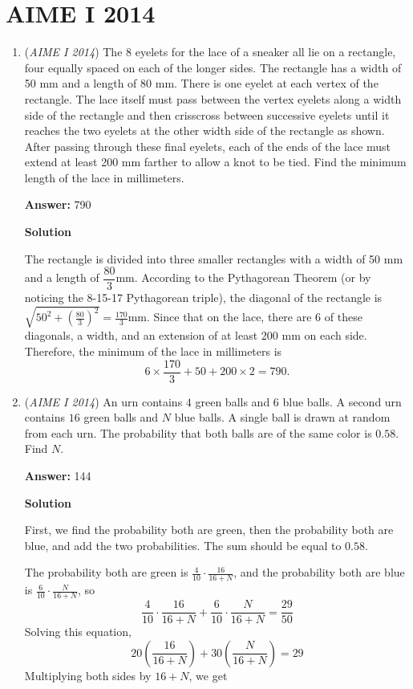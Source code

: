 \section{AIME I 2014}
        \begin{enumerate}
        	\item (\textit{AIME I 2014}) The 8 eyelets for the lace of a sneaker all lie on a rectangle, four equally spaced on each of the longer sides. The rectangle has a width of 50 mm and a length of 80 mm. There is one eyelet at each vertex of the rectangle. The lace itself must pass between the vertex eyelets along a width side of the rectangle and then crisscross between successive eyelets until it reaches the two eyelets at the other width side of the rectangle as shown. After passing through these final eyelets, each of the ends of the lace must extend at least 200 mm farther to allow a knot to be tied. Find the minimum length of the lace in millimeters. 


 
 \textbf{Answer: }790



\textbf{Solution}

The rectangle is divided into three smaller rectangles with a width of 50 mm and a length of $\dfrac{80}{3}$mm.  According to the Pythagorean Theorem (or by noticing the 8-15-17 Pythagorean triple), the diagonal of the rectangle is$\sqrt{50^2+\left(\frac{80}{3}\right)^2}=\frac{170}{3}$mm.  Since that on the lace, there are 6 of these diagonals, a width, and an extension of at least 200 mm on each side.  Therefore, the minimum of the lace in millimeters is
 \[6\times \dfrac{170}{3}+50+200\times 2=\boxed{790}.\]



	\item (\textit{AIME I 2014}) An urn contains $4$ green balls and $6$ blue balls. A second urn contains $16$ green balls and $N$ blue balls. A single ball is drawn at random from each urn. The probability that both balls are of the same color is $0.58$. Find $N$.


 
 \textbf{Answer: }144



\textbf{Solution}

First, we find the probability both are green, then the probability both are blue, and add the two probabilities. The sum should be equal to $0.58$. 

 The probability both are green is $\frac{4}{10}\cdot\frac{16}{16+N}$, and the probability both are blue is $\frac{6}{10}\cdot\frac{N}{16+N}$, so 
 \[\frac{4}{10}\cdot\frac{16}{16+N}+\frac{6}{10}\cdot\frac{N}{16+N}=\frac{29}{50}\]Solving this equation, 
 \[20\left(\frac{16}{16+N}\right)+30\left(\frac{N}{16+N}\right)=29\]Multiplying both sides by $16+N$, we get


\end{enumerate}
